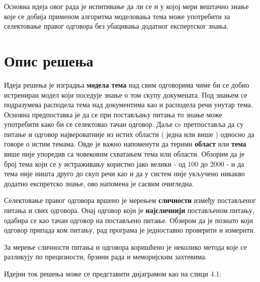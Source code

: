 Основна идеја овог рада је испитивање да ли се и у којој мери вештачно знање које се добија применом алгоритма моделовања тема може употребити за селектовање правог одговора без убацивања додатног експертског знања.


\section{Опис решења}

Идеја решења је изградња \textbf{модела тема} над свим одговорима чиме би се добио истрениран модел који поседује знање о том скупу докумената. Под знањем се подразумева расподела тема над документима као и расподела речи унутар тема. Основна предпоставка је да се при постављању питања то знање може употребити како би се селектовао тачан одговор. Даље сe претпоставља да су  питање и одговор  највероватније из истих области ( једна или више ) односно да говоре о истим темама. Овде је важно напоменути да теримн \textbf{област} или \textbf{тема} више није упоредив са човековим схватањем тема или области. Обзорим да је број тема који се у истраживању користио јако велики - од 100 до 2000 - и да тема није ништа друго до скуп речи као и да у систем није укључено никакво додатно експретско знање, ово напомена је сасвим очигледна.

Селектовање правог одговора вршено је мерењем \textbf{сличности} између постављеног питања и свих одговора. Онај одговор који је \textbf{најсличнији} постављеном питању, одабира се као тачан одговор на постављено питање. Обзиром да је познато који одговор припада ком питању, рад програма је једноставно проверити и измерити.

За мерење сличности питања и одговора коришћено је неколико метода које се разликују  по прецизности, брзини рада и меморијским захтевима. 


Идејни ток решења може се представити  дијаграмом као на слици 4.1:

